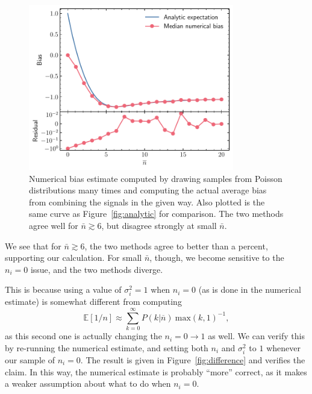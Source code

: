 \documentclass{article}
\begin{document}
\begin{figure}
	\begin{center}
		\includegraphics[width=0.8\textwidth]{figures/numerical_estimate.pdf}
	\end{center}
	\caption{%
		Numerical bias estimate computed by drawing samples from
		Poisson distributions many times and computing the actual
		average bias from combining the signals in the given way. Also
		plotted is the same curve as Figure~\ref{fig:analytic} for
		comparison. The two methods agree well for $\bar n \gtrsim 6$,
		but disagree strongly at small $\bar n$.
	}
	\label{fig:numerical}
\end{figure}

We see that for $\bar n \gtrsim 6$, the two methods agree to better than a
percent, supporting our calculation. For small $\bar n$, though, we become
sensitive to the $n_i = 0$ issue, and the two methods diverge.

This is because using a value of $\sigma_i^2 = 1$ when $n_i = 0$ (as is done in
the numerical estimate) is somewhat different from computing 
\begin{equation}
\mathbb{E}[1/n] \approx \sum_{k=0}^{\infty} P(k|\overline n) \ \text{max}(k,1)^{-1},
\end{equation}
as this second one is actually changing the $n_i = 0 \to 1$ as well. We can
verify this by re-running the numerical estimate, and setting both $n_i$ and
$\sigma_i^2$ to $1$ whenever our sample of $n_i = 0$. The result is given in
Figure~\ref{fig:difference} and verifies the claim. In this way, the numerical
estimate is probably ``more'' correct, as it makes a weaker assumption about
what to do when $n_i = 0$.
\end{document}
